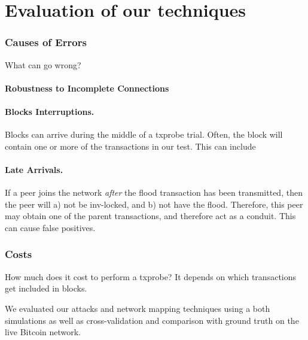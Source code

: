 \section{Evaluation of our techniques}

\subsubsection{Causes of Errors}
What can go wrong?

\paragraph{Robustness to Incomplete Connections}


\paragraph{Blocks Interruptions.} Blocks can arrive during the middle of a txprobe trial. Often, the block will contain one or more of the transactions in our test. This can include  

\paragraph{Late Arrivals.} If a peer joins the network \emph{after} the flood transaction has been transmitted, then the peer will a) not be inv-locked, and b) not have the flood. Therefore, this peer may obtain one of the parent transactions, and therefore act as a conduit. This can cause false positives. 

\subsubsection{Costs}
How much does it cost to perform a txprobe? It depends on which transactions get included in blocks.

We evaluated our attacks and network mapping techniques using a both simulations as well as cross-validation and comparison with ground truth on the live Bitcoin network.

